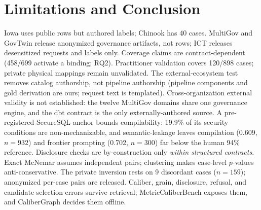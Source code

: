 \documentclass[letterpaper]{article}
\begin{document}
\section{Limitations and Conclusion}

 Iowa \citep{iowaliquor} uses public rows but authored labels; Chinook has 40 cases. MultiGov and GovTwin release anonymized governance artifacts, not rows; ICT releases desensitized requests and labels only. Coverage claims are contract-dependent (458/699 activate a binding; RQ2). Practitioner validation covers 120/898 cases; private physical mappings remain unvalidated. The external-ecosystem test removes catalog authorship, not pipeline authorship (pipeline components and gold derivation are ours; request text is templated). Cross-organization external validity is not established: the twelve MultiGov domains share one governance engine, and the dbt contract is the only externally-authored source. A pre-registered SecureSQL anchor bounds compilability: 19.9\% of its security conditions are non-mechanizable, and semantic-leakage leaves compilation (0.609, $n{=}932$) and frontier prompting (0.702, $n{=}300$) far below the human 94\% reference. Disclosure checks are by-construction only \emph{within structured contracts}. Exact McNemar assumes independent pairs; clustering makes case-level $p$-values anti-conservative. The private inversion rests on 9 discordant cases ($n{=}159$); anonymized per-case pairs are released. Caliber, grain, disclosure, refusal, and candidate-selection errors survive retrieval; MetricCaliberBench exposes them, and CaliberGraph decides them offline.


\end{document}
